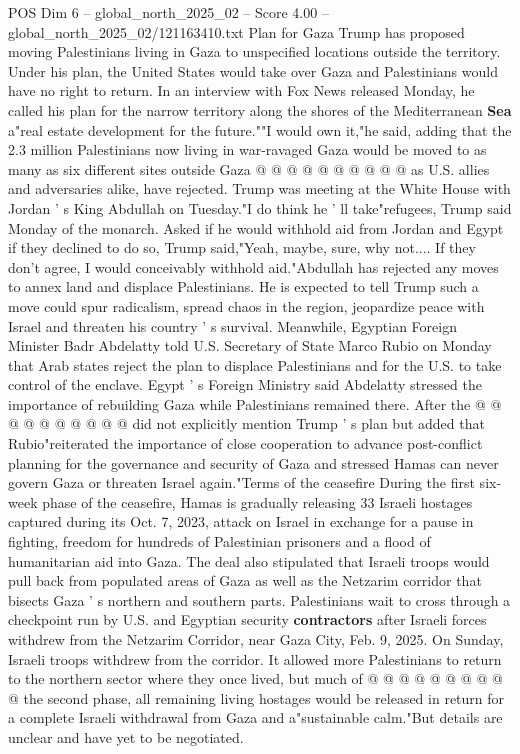 \begin{textsample}{POS Dim 6 – global\_north\_2025\_02 – Score 4.00 – global\_north\_2025\_02/121163410.txt}
Plan for Gaza Trump has proposed moving Palestinians living in Gaza to unspecified locations outside the territory.
Under his plan, the United States would take over Gaza and Palestinians would have no right to return.
In an interview with Fox News released Monday, he called his plan for the narrow territory along the shores of the Mediterranean \textbf{Sea} a"real estate development for the future.""I would own it,"he said, adding that the 2.3 million Palestinians now living in war-ravaged Gaza would be moved to as many as six different sites outside Gaza @ @ @ @ @ @ @ @ @ @ as U.S. allies and adversaries alike, have rejected.
Trump was meeting at the White House with Jordan ' s King Abdullah on Tuesday."I do think he ' ll take"refugees, Trump said Monday of the monarch.
Asked if he would withhold aid from Jordan and Egypt if they declined to do so, Trump said,"Yeah, maybe, sure, why not....
If they don't agree, I would conceivably withhold aid."Abdullah has rejected any moves to annex land and displace Palestinians.
He is expected to tell Trump such a move could spur radicalism, spread chaos in the region, jeopardize peace with Israel and threaten his country ' s survival.
Meanwhile, Egyptian Foreign Minister Badr Abdelatty told U.S.
Secretary of State Marco Rubio on Monday that Arab states reject the plan to displace Palestinians and for the U.S. to take control of the enclave.
Egypt ' s Foreign Ministry said Abdelatty stressed the importance of rebuilding Gaza while Palestinians remained there.
After the @ @ @ @ @ @ @ @ @ @ did not explicitly mention Trump ' s plan but added that Rubio"reiterated the importance of close cooperation to advance post-conflict planning for the governance and security of Gaza and stressed Hamas can never govern Gaza or threaten Israel again."Terms of the ceasefire During the first six-week phase of the ceasefire, Hamas is gradually releasing 33 Israeli hostages captured during its Oct. 7, 2023, attack on Israel in exchange for a pause in fighting, freedom for hundreds of Palestinian prisoners and a flood of humanitarian aid into Gaza.
The deal also stipulated that Israeli troops would pull back from populated areas of Gaza as well as the Netzarim corridor that bisects Gaza ' s northern and southern parts.
Palestinians wait to cross through a checkpoint run by U.S. and Egyptian security \textbf{contractors} after Israeli forces withdrew from the Netzarim Corridor, near Gaza City, Feb. 9, 2025.
On Sunday, Israeli troops withdrew from the corridor.
It allowed more Palestinians to return to the northern sector where they once lived, but much of @ @ @ @ @ @ @ @ @ @ the second phase, all remaining living hostages would be released in return for a complete Israeli withdrawal from Gaza and a"sustainable calm."But details are unclear and have yet to be negotiated.

\end{textsample}
